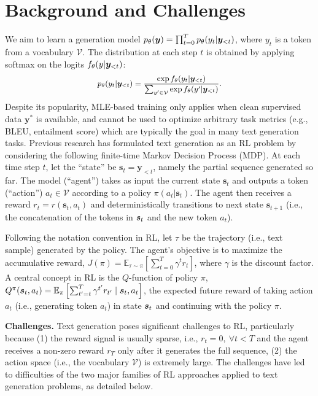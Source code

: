

\section{Background and Challenges}
\label{subsec:preliminaries}

We aim to learn a generation model
$p_{\theta} (\bm{y}) = \prod_{t=0}^T p_{\theta}(y_t | \bm{y}_{<t})$, where
$y_t$ is a token from a vocabulary $\mathcal{V}$. The distribution at each step $t$ is obtained by applying softmax on the logits $f_\theta(y | \bm{y}_{<t})$:
\begin{equation}
\small
\begin{split}
    p_\theta(y_t | \y_{<t}) = \frac{\exp f_\theta(y_t | \y_{<t}) }{ \sum_{y'\in\mathcal{V}} \exp f_\theta(y' | \y_{<t} ) }.
\end{split}
\label{eq:softmax-logit}
\end{equation}
Despite its popularity, MLE-based training only applies when clean supervised data $\bm{y}^*$ is available, and cannot be used to optimize arbitrary task metrics (e.g., BLEU, entailment score) which are typically the goal in many text generation tasks. 
\label{sec:background:rl}
Previous research has formulated text generation as an RL problem by considering the following finite-time Markov Decision Process (MDP). 
At each time step $t$, let the ``state'' be $\bm{s}_t = \bm{y}_{< t}$, namely the partial sequence generated so far. The model (``agent'') takes as input the current state $\bm{s}_t$ and outputs a token (``action'') $a_t \in \mathcal{V}$ according to a policy $\pi(a_t | \bm{s}_t)$. 
The agent then receives a reward $r_t = r(\bm{s}_t, a_t)$ and deterministically transitions to next state $\bm{s}_{t+1}$ (i.e., the concatenation of the tokens in $\bm{s}_t$ and the new token $a_t$). 

Following the notation convention in RL, let $\tau$ be the trajectory (i.e., text sample) generated by the policy. The agent's objective is to maximize the accumulative reward,
$J(\pi) = \mathbb{E}_{\tau \sim \pi}\left[ \sum^T_{t=0} \gamma^t r_t \right]$,
where $\gamma$ is the discount factor.
A central concept in RL is the $Q$-function of policy $\pi$, $Q^\pi(\bm{s}_t, a_t)=\mathbb{E}_{\pi}\left[ \sum_{t'=t}^T \gamma^{t'} r_{t'} \mid \bm{s}_t, a_t \right]$, the expected future reward of taking action $a_t$ (i.e., generating token $a_t$) in state $\bm{s}_t$ and continuing with the policy $\pi$. 

\noindent\textbf{Challenges. } Text generation poses significant challenges to RL, particularly because (1) the reward signal is usually sparse, i.e., $r_t = 0,\ \forall t<T$ and the agent receives a non-zero reward $r_{T}$ only after it generates the full sequence, (2) the action space (i.e., the vocabulary $\mathcal{V}$) is extremely large.
The challenges have led to difficulties of the two major families of RL approaches applied to text generation problems, as detailed below.

